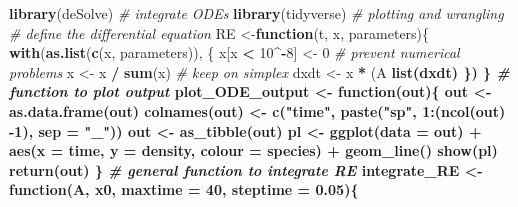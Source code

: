 \documentclass[]{book}
\newenvironment{Shaded}{\begin{snugshade}}{\end{snugshade}}
\newcommand{\CommentTok}[1]{\textcolor[rgb]{0.56,0.35,0.01}{\textit{#1}}}
\newcommand{\ControlFlowTok}[1]{\textcolor[rgb]{0.13,0.29,0.53}{\textbf{#1}}}
\newcommand{\DataTypeTok}[1]{\textcolor[rgb]{0.13,0.29,0.53}{#1}}
\newcommand{\DecValTok}[1]{\textcolor[rgb]{0.00,0.00,0.81}{#1}}
\newcommand{\FloatTok}[1]{\textcolor[rgb]{0.00,0.00,0.81}{#1}}
\newcommand{\KeywordTok}[1]{\textcolor[rgb]{0.13,0.29,0.53}{\textbf{#1}}}
\newcommand{\NormalTok}[1]{#1}
\newcommand{\OperatorTok}[1]{\textcolor[rgb]{0.81,0.36,0.00}{\textbf{#1}}}
\newcommand{\StringTok}[1]{\textcolor[rgb]{0.31,0.60,0.02}{#1}}
\begin{document}
\begin{Shaded}
\begin{Highlighting}[]
\KeywordTok{library}\NormalTok{(deSolve) }\CommentTok{# integrate ODEs}
\KeywordTok{library}\NormalTok{(tidyverse) }\CommentTok{# plotting and wrangling}
\CommentTok{# define the differential equation}
\NormalTok{RE <-}\ControlFlowTok{function}\NormalTok{(t, x, parameters)\{}
  \KeywordTok{with}\NormalTok{(}\KeywordTok{as.list}\NormalTok{(}\KeywordTok{c}\NormalTok{(x, parameters)), \{}
\NormalTok{    x[x }\OperatorTok{<}\StringTok{ }\DecValTok{10}\OperatorTok{^-}\DecValTok{8}\NormalTok{] <-}\StringTok{ }\DecValTok{0} \CommentTok{# prevent numerical problems}
\NormalTok{    x <-}\StringTok{ }\NormalTok{x }\OperatorTok{/}\StringTok{ }\KeywordTok{sum}\NormalTok{(x) }\CommentTok{# keep on simplex}
\NormalTok{    dxdt <-}\StringTok{ }\NormalTok{x }\OperatorTok{*}\StringTok{ }\NormalTok{(A }\OperatorTok{%
    \KeywordTok{list}\NormalTok{(dxdt)}
\NormalTok{  \})}
\NormalTok{\}}
\CommentTok{# function to plot output}
\NormalTok{plot_ODE_output <-}\StringTok{ }\ControlFlowTok{function}\NormalTok{(out)\{}
\NormalTok{  out <-}\StringTok{ }\KeywordTok{as.data.frame}\NormalTok{(out)}
  \KeywordTok{colnames}\NormalTok{(out) <-}\StringTok{ }\KeywordTok{c}\NormalTok{(}\StringTok{"time"}\NormalTok{, }\KeywordTok{paste}\NormalTok{(}\StringTok{"sp"}\NormalTok{, }\DecValTok{1}\OperatorTok{:}\NormalTok{(}\KeywordTok{ncol}\NormalTok{(out) }\DecValTok{-1}\NormalTok{), }\DataTypeTok{sep =} \StringTok{"_"}\NormalTok{))}
\NormalTok{  out <-}\StringTok{ }\KeywordTok{as_tibble}\NormalTok{(out) }\OperatorTok{%
\NormalTok{  pl <-}\StringTok{ }\KeywordTok{ggplot}\NormalTok{(}\DataTypeTok{data =}\NormalTok{ out) }\OperatorTok{+}\StringTok{ }
\StringTok{    }\KeywordTok{aes}\NormalTok{(}\DataTypeTok{x =}\NormalTok{ time, }\DataTypeTok{y =}\NormalTok{ density, }\DataTypeTok{colour =}\NormalTok{ species) }\OperatorTok{+}\StringTok{ }
\StringTok{    }\KeywordTok{geom_line}\NormalTok{()}
  \KeywordTok{show}\NormalTok{(pl)}
  \KeywordTok{return}\NormalTok{(out)}
\NormalTok{\}}
\CommentTok{# general function to integrate RE}
\NormalTok{integrate_RE <-}\StringTok{ }\ControlFlowTok{function}\NormalTok{(A, x0, }\DataTypeTok{maxtime =} \DecValTok{40}\NormalTok{, }\DataTypeTok{steptime =} \FloatTok{0.05}\NormalTok{)\{}
}}
\end{Highlighting}
\end{Shaded}
\end{document}
